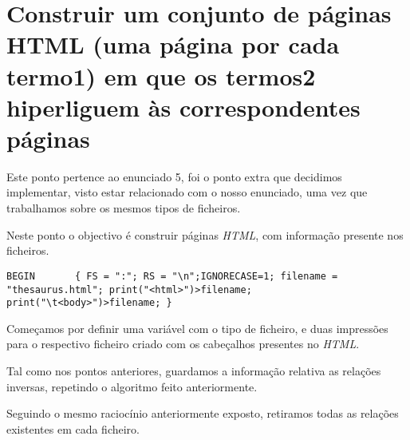 \documentclass{report}
\def\titulo#1{\section{#1}}
\begin{document}
\titulo{ Construir um conjunto de páginas HTML (uma página por cada termo1) em que os termos2 hiperliguem às correspondentes páginas }

    Este ponto pertence ao enunciado 5, foi o ponto extra que decidimos implementar, visto estar relacionado com o nosso enunciado, uma vez que trabalhamos sobre os mesmos tipos de ficheiros.

    Neste ponto o objectivo é construir páginas \textit{HTML}, com informação presente nos ficheiros.

\bigskip  

\begin{verbatim}
BEGIN       { FS = ":"; RS = "\n";IGNORECASE=1; filename = "thesaurus.html"; print("<html>")>filename; print("\t<body>")>filename; }
\end{verbatim}

    Começamos por definir uma variável com o tipo de ficheiro, e duas impressões para o respectivo ficheiro criado com os cabeçalhos presentes no \textit{HTML}.

    Tal como nos pontos anteriores, guardamos a informação relativa as relações inversas, repetindo o algoritmo feito anteriormente.

    Seguindo o mesmo raciocínio anteriormente exposto, retiramos todas as relações existentes em cada ficheiro.
\end{document}
